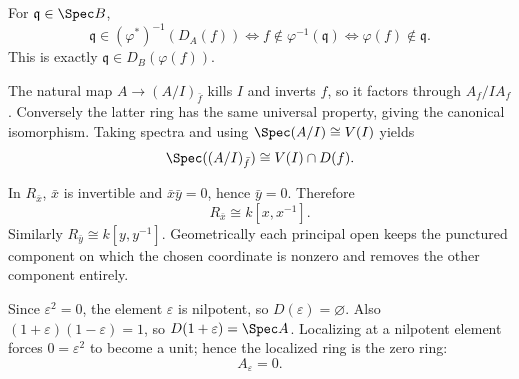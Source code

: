 \begin{solution}[VI.08.E17]
For $\mathfrak q\in\Spec B$,
\[
\mathfrak q\in(\varphi^\ast)^{-1}(D_A(f))
\iff f\notin\varphi^{-1}(\mathfrak q)
\iff \varphi(f)\notin\mathfrak q.
\]
This is exactly $\mathfrak q\in D_B(\varphi(f))$.
\end{solution}

\begin{solution}[VI.08.E18]
The natural map $A\to(A/I)_{\bar f}$ kills $I$ and inverts $f$, so it factors through $A_f/IA_f$.
Conversely the latter ring has the same universal property, giving the canonical isomorphism.  Taking spectra and using
$\Spec(A/I)\cong V(I)$ yields
\[
\Spec((A/I)_{\bar f})\cong V(I)\cap D(f).
\]
\end{solution}

\begin{solution}[VI.08.E19]
In $R_{\bar x}$, $\bar x$ is invertible and $\bar x\bar y=0$, hence $\bar y=0$.  Therefore
\[
R_{\bar x}\cong k[x,x^{-1}].
\]
Similarly $R_{\bar y}\cong k[y,y^{-1}]$.  Geometrically each principal open keeps the punctured component on which the
chosen coordinate is nonzero and removes the other component entirely.
\end{solution}

\begin{solution}[VI.08.E20]
Since $\varepsilon^2=0$, the element $\varepsilon$ is nilpotent, so $D(\varepsilon)=\varnothing$.
Also $(1+\varepsilon)(1-\varepsilon)=1$, so $D(1+\varepsilon)=\Spec A$.  Localizing at a nilpotent element forces
$0=\varepsilon^2$ to become a unit; hence the localized ring is the zero ring:
\[
A_\varepsilon=0.
\]
\end{solution}
